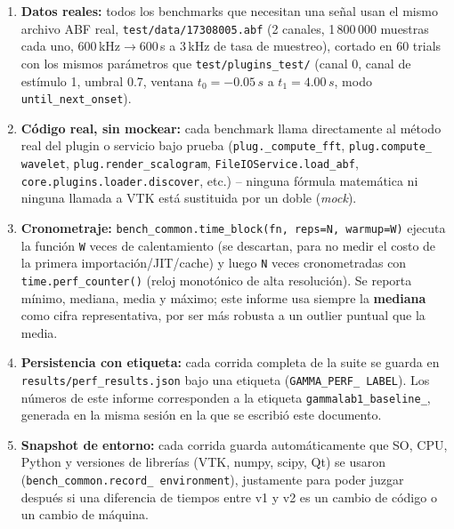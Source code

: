 \documentclass[11pt,a4paper]{article}
\begin{document}
\begin{enumerate}
  \item \textbf{Datos reales:} todos los benchmarks que necesitan una señal usan el mismo archivo ABF real,
        \texttt{test/data/17308005.abf} (2 canales, 1\,800\,000 muestras cada uno, 600\,kHz$\to$600\,s a
        3\,kHz de tasa de muestreo), cortado en 60 trials con los mismos parámetros que
        \texttt{test/plugins\_\allowbreak test/} (canal 0, canal de estímulo 1, umbral 0.7, ventana
        $t_0=-0.05\,s$ a $t_1=4.00\,s$, modo \texttt{until\_\allowbreak next\_\allowbreak onset}).
  \item \textbf{Código real, sin mockear:} cada benchmark llama directamente al método real del plugin o
        servicio bajo prueba (\texttt{plug.\_\allowbreak compute\_\allowbreak fft}, \texttt{plug.compute\_\allowbreak
        wavelet}, \texttt{plug.render\_\allowbreak scalogram}, \texttt{FileIOService.load\_\allowbreak abf},
        \texttt{core.plugins.loader.discover}, etc.) -- ninguna fórmula matemática ni ninguna llamada a VTK
        está sustituida por un doble (\textit{mock}).
  \item \textbf{Cronometraje:} \texttt{bench\_\allowbreak common.time\_\allowbreak block(fn, reps=N,
        warmup=W)} ejecuta la función \texttt{W} veces de calentamiento (se descartan, para no medir el
        costo de la primera importación/JIT/cache) y luego \texttt{N} veces cronometradas con
        \texttt{time.perf\_\allowbreak counter()} (reloj monotónico de alta resolución). Se reporta mínimo,
        mediana, media y máximo; este informe usa siempre la \textbf{mediana} como cifra representativa, por
        ser más robusta a un outlier puntual que la media.
  \item \textbf{Persistencia con etiqueta:} cada corrida completa de la suite se guarda en
        \texttt{results/perf\_\allowbreak results.json} bajo una etiqueta (\texttt{GAMMA\_\allowbreak PERF\_\allowbreak
        LABEL}). Los números de este informe corresponden a la etiqueta
        \texttt{gammalab1\_\allowbreak baseline\_}, generada en la
        misma sesión en la que se escribió este documento.
  \item \textbf{Snapshot de entorno:} cada corrida guarda automáticamente que SO, CPU, Python y versiones de
        librerías (VTK, numpy, scipy, Qt) se usaron (\texttt{bench\_\allowbreak common.record\_\allowbreak
        environment}), justamente para poder juzgar después si una diferencia de tiempos entre v1 y v2 es un
        cambio de código o un cambio de máquina.
\end{enumerate}
\end{document}

